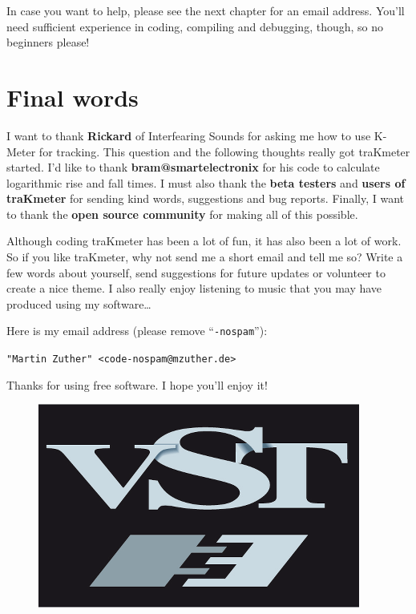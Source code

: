 In case you want to help, please see the next chapter for an email
address.  You’ll need sufficient experience in coding, compiling and
debugging, though, so no beginners please!

\chapter{Final words}
\label{chap:final_words}

I want to thank \textbf{Rickard} of Interfearing Sounds for asking me
how to use K-Meter for tracking.  This question and the following
thoughts really got traKmeter started.  I'd like to thank
\textbf{bram@smartelectronix} for his code to calculate logarithmic
rise and fall times.  I must also thank the \textbf{beta testers} and
\textbf{users of traKmeter} for sending kind words, suggestions and
bug reports.  Finally, I want to thank the \textbf{open source
  community} for making all of this possible.

Although coding traKmeter has been a lot of fun, it has also been a
lot of work.  So if you like traKmeter, why not send me a short email
and tell me so?  Write a few words about yourself, send suggestions
for future updates or volunteer to create a nice theme.  I also really
enjoy listening to music that you may have produced using my
software\dots

Here is my email address (please remove ``\texttt{-nospam}''):

\begin{center}
  \texttt{"Martin Zuther" <code-nospam@mzuther.de>}
\end{center}

Thanks for using free software.  I hope you'll enjoy it!

\begin{figure}
  \includegraphics[scale=0.40,clip]{include/images/trademark_vst.png}
\end{figure}

